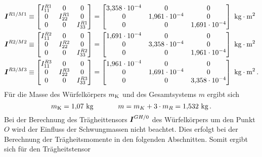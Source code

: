 \begin{equation}
\begin{split}
\boldsymbol{I}^{R1/M1} &\equiv \begin{bmatrix}
I^{R1}_{\text{11}} & 0 & 0 \\ 0 & I^{R1}_{\text{22}} & 0 \\ 0 & 0 & I^{R1}_{\text{33}}
\end{bmatrix} = 
\begin{bmatrix}
3{,}358\cdot 10^{-4} & 0 & 0 \\
0 & 1{,}961\cdot 10^{-4} & 0 \\
0 & 0 & 1{,}691\cdot 10^{-4}
\end{bmatrix} \text{ kg}\cdot \text{m}^2
\\
\boldsymbol{I}^{R2/M2} &\equiv \begin{bmatrix}
I^{R2}_{\text{11}} & 0 & 0 \\ 0 & I^{R2}_{\text{22}} & 0 \\ 0 & 0 & I^{R2}_{\text{33}}
\end{bmatrix} = 
\begin{bmatrix}
1{,}691\cdot 10^{-4} & 0 & 0 \\
0 & 3{,}358\cdot 10^{-4} & 0 \\
0 & 0 & 1{,}961\cdot 10^{-4}
\end{bmatrix} \text{ kg}\cdot \text{m}^2
\\
\boldsymbol{I}^{R3/M3} &\equiv \begin{bmatrix}
I^{R3}_{\text{11}} & 0 & 0 \\ 0 & I^{R3}_{\text{22}} & 0 \\ 0 & 0 & I^{R3}_{\text{33}}
\end{bmatrix} = 
\begin{bmatrix}
1{,}961\cdot 10^{-4} & 0 & 0 \\
0 & 1{,}691\cdot 10^{-4} & 0 \\
0 & 0 & 3{,}358\cdot 10^{-4}
\end{bmatrix} \text{ kg}\cdot \text{m}^2 \,.
\end{split}
\end{equation}
Für die Masse des Würfelkörpers $m_{\text{K}}$ und des Gesamtsystems $m$ ergibt sich
\begin{equation}
m_{\text{K}} = 1{,}07 \text{ kg} \hspace{35pt} m = m_K + 3\cdot m_R = 1{,}532 \text{ kg}\,.
\end{equation}
Bei der Berechnung des Trägheittensors $\boldsymbol{I}^{GH/0}$ des Würfelkörpers um den Punkt $O$ wird der Einfluss der Schwungmassen nicht beachtet. Dies erfolgt bei der Berechnung der Trägheitsmomente in den folgenden Abschnitten. Somit ergibt sich für den Trägheitstensor
